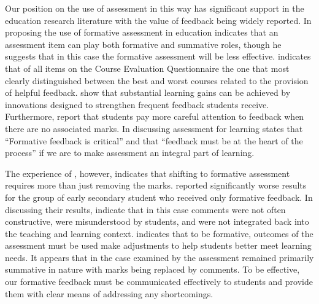 Our position on the use of assessment in this way has significant support in the education research literature with the value of feedback being widely reported. In proposing the use of formative assessment in education \citet{Bloom:1969} indicates that an assessment item can play both formative and summative roles, though he suggests that in this case the formative assessment will be less effective. \citet{Ramsden:1992} indicates that of all items on the Course Evaluation Questionnaire \cite{Ramsden:1991} the one that most clearly distinguished between the best and worst courses related to the provision of helpful feedback. \citet{Black:1998} show that substantial learning gains can be achieved by innovations designed to strengthen frequent feedback students receive. Furthermore, \citet{Black:1998} report that students pay more careful attention to feedback when there are no associated marks. In discussing assessment for learning \citet{Brown:2004} states that ``Formative feedback is critical'' and that ``feedback must be at the heart of the process'' if we are to make assessment an integral part of learning.


The experience of \citet{Smith:2005}, however, indicates that shifting to formative assessment requires more than just removing the marks. \citet{Smith:2005} reported significantly worse results for the group of early secondary student who received only formative feedback. In discussing their results, \citet{Smith:2005} indicate that in this case comments were not often constructive, were misunderstood by students, and were not integrated back into the teaching and learning context. \citet{William:2006} indicates that to be formative, outcomes of the assessment must be used make adjustments to help students better meet learning needs. It appears that in the case examined by \citet{Smith:2005} the assessment remained primarily summative in nature with marks being replaced by comments. To be effective, our formative feedback must be communicated effectively to students and provide them with clear means of addressing any shortcomings.

